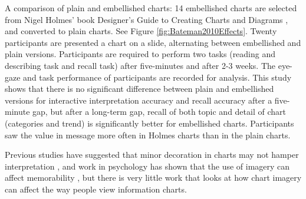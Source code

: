 \documentclass{egpubl}
\begin{document}
A comparison of plain and embellished charts: 14 embellished charts are selected from Nigel Holmes' book Designer's Guide to Creating 
Charts and Diagrams \cite{holmes}, and converted to plain charts. See Figure \ref{fig:Bateman2010Effects}. Twenty participants are presented a chart on a slide, alternating between embellished and plain versions. Participants are required to perform two tasks (reading and describing task and recall task) after five-minutes and after 2-3 weeks. The eye-gaze and task performance of participants are recorded for analysis. This study shows that there is no significant difference between plain and embellished versions for interactive interpretation accuracy and recall accuracy after a five-minute gap,
but after a long-term gap, recall of both topic and detail of chart (categories and trend) is significantly better for embellished charts. Participants saw the value in message more often in Holmes charts than in the plain charts.

Previous studies have suggested that minor decoration in charts may not hamper interpretation \cite{Blasio}, and work in psychology has shown that the use of imagery can affect memorability \cite{gambrell}, but there is very little work that looks at how chart imagery can affect the way people view information charts. 
\end{document}
